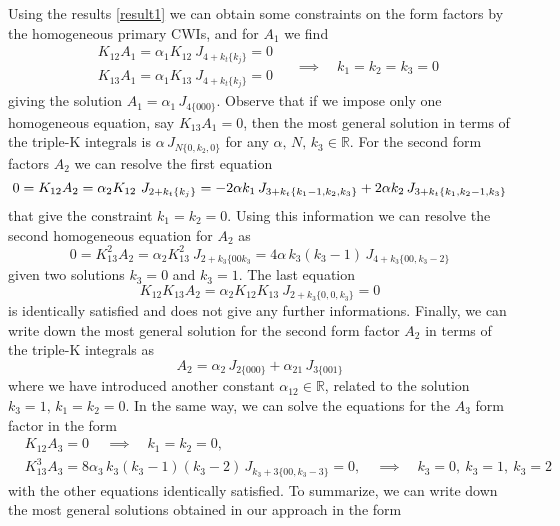 \documentclass[a4paper,11pt,openright,twoside]{book}
\let\a=\alpha   \let\b=\beta   \let\g=\gamma   \let\d=\delta
\numberwithin{equation}{section}
\begin{document}
{{{Using the results \eqref{result1} we can obtain some constraints on the form factors by the homogeneous primary CWIs, and for $A_1$ we find 
\begin{equation}
	\begin{matrix}
		&K_{12}A_1=\a_1K_{12}\ J_{4+k_t\{k_j\}}=0\\[1.2ex]
		&K_{13}A_1=\a_1K_{13}\ J_{4+k_t\{k_j\}}=0
	\end{matrix}
	\,\quad \implies\quad k_1=k_2=k_3=0
\end{equation}
giving the solution $A_1=\a_1\,J_{4\{000\}}$. Observe that if we impose only one homogeneous equation, say $K_{13}A_1=0$, then the most general solution in terms of the triple-K integrals is $\a\,J_{N\{0,k_2,0\}}$ for any $\a,\,N,\,k_3\in\mathbb{R}$. For the second form factors $A_2$ we can resolve the first equation
\begin{equation}
	0=K_{12}A_2=\a_2K_{12}\ J_{2+k_t\{k_j\}}=-2\a k_1\,J_{3+k_t\{k_1-1,k_2,k_3\}}+ 2\a k_2\,J_{3+k_t\{k_1,k_2-1,k_3\}}\,\\[1.2ex]
\end{equation}
that give the constraint $k_1=k_2=0$. Using this information we can resolve the second homogeneous equation for $A_2$ as
\begin{equation}
	0=K_{13}^2A_2=\a_2K^2_{13}\ J_{2+k_3\{00 k_3}=4\a\,k_3(k_3-1)\,J_{4+k_3\{00,k_3-2\}}
\end{equation}
given two solutions $k_3=0$ and $k_3=1$. The last equation 
\begin{equation}
	K_{12}K_{13}A_2=\a_2K_{12}K_{13}\ J_{2+k_3\{0,0,k_3\}}=0
\end{equation}
is identically satisfied and does not give any further informations. Finally, we can write down the most general solution for the second form factor $A_2$ in terms of the triple-K integrals as
\begin{equation}
	A_2=\a_2\,J_{2\{000\}}+\a_{21}\,J_{3\{001\}}
\end{equation}
where we have introduced another constant $\a_{12}\in\mathbb R$, related to the solution $k_3=1,\,k_1=k_2=0$. In the same way, we can solve the equations for the $A_3$ form factor in the form
\begin{align}
	&K_{12}A_3=0\,\quad\implies\quad k_1=k_2=0,\\[1.4ex]
	&K_{13}^3A_3=8\a_3\,k_3(k_3-1)(k_3-2)\,J_{k_3+3\{00,k_3-3\}}=0,\quad\implies\quad k_3=0,\ k_3=1,\ k_3=2
\end{align}
with the other equations identically satisfied. To summarize, we can write down the most general solutions obtained in our approach in the form
}}}
\end{document}
